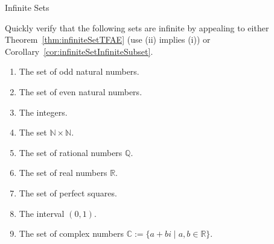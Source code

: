 \begin{section}{Infinite Sets}
\begin{exercise}\label{exer:moreInfiniteSets}
Quickly verify that the following sets are infinite by appealing to either Theorem~\ref{thm:infiniteSetTFAE} (use (ii) implies (i)) or Corollary~\ref{cor:infiniteSetInfiniteSubset}.
\begin{enumerate}[label=\textrm{(\alph*)}]
\item The set of odd natural numbers.
\item The set of even natural numbers.
\item The integers.
\item The set $\mathbb{N}\times \mathbb{N}$.
\item The set of rational numbers $\mathbb{Q}$.
\item The set of real numbers $\mathbb{R}$.
\item The set of perfect squares.
\item The interval $(0,1)$.
\item The set of complex numbers $\mathbb{C}:=\{a+bi\mid a,b\in\mathbb{R}\}$.
\end{enumerate}
\end{exercise}


\end{section}